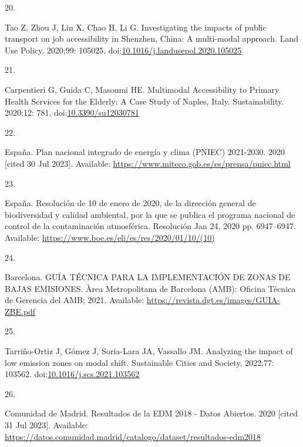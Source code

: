 \documentclass[10pt,letterpaper]{article}
\newlength{\cslhangindent}
\newlength{\csllabelwidth}
\newlength{\cslentryspacingunit} %
\newenvironment{CSLReferences}[2] %
 {%
  \setlength{\parindent}{0pt}
  \ifodd #1
  \let\oldpar\par
  \def\par{\hangindent=\cslhangindent\oldpar}
  \fi
  \setlength{\parskip}{#2\cslentryspacingunit}
 }%
 {}
\newcommand{\CSLLeftMargin}[1]{\parbox[t]{\csllabelwidth}{#1}}
\newcommand{\CSLRightInline}[1]{\parbox[t]{\linewidth - \csllabelwidth}{#1}\break}
\begin{document}
\begin{CSLReferences}{0}{0}
\leavevmode{}%
\CSLLeftMargin{20. }%
\CSLRightInline{Tao Z, Zhou J, Lin X, Chao H, Li G. Investigating the
impacts of public transport on job accessibility in {Shenzhen}, {China}:
A multi-modal approach. Land Use Policy. 2020;99: 105025.
doi:\href{https://doi.org/10.1016/j.landusepol.2020.105025}{10.1016/j.landusepol.2020.105025}}

\leavevmode{}%
\CSLLeftMargin{21. }%
\CSLRightInline{Carpentieri G, Guida C, Masoumi HE. Multimodal
{Accessibility} to {Primary Health Services} for the {Elderly}: {A Case
Study} of {Naples}, {Italy}. Sustainability. 2020;12: 781.
doi:\href{https://doi.org/10.3390/su12030781}{10.3390/su12030781}}

\leavevmode{}%
\CSLLeftMargin{22. }%
\CSLRightInline{España. Plan nacional integrado de energía y clima
({PNIEC}) 2021-2030. 2020 {[}cited 30 Jul 2023{]}. Available:
\url{https://www.miteco.gob.es/es/prensa/pniec.html}}

\leavevmode{}%
\CSLLeftMargin{23. }%
\CSLRightInline{España. Resolución de 10 de enero de 2020, de la
dirección general de biodiversidad y calidad ambiental, por la que se
publica el programa nacional de control de la contaminación atmosférica.
Resolución Jan 24, 2020 pp. 6947--6947. Available:
\url{https://www.boe.es/eli/es/res/2020/01/10/(10)}}

\leavevmode{}%
\CSLLeftMargin{24. }%
\CSLRightInline{Barcelona. {GUÍA} {TÉCNICA} {PARA} {LA} {IMPLEMENTACIÓN}
{DE} {ZONAS} {DE} {BAJAS} {EMISIONES}. Àrea Metropolitana de Barcelona
({AMB}): Oficina Técnica de Gerencia del {AMB}; 2021. Available:
\url{https://revista.dgt.es/images/GUIA-ZBE.pdf}}

\leavevmode{}%
\CSLLeftMargin{25. }%
\CSLRightInline{Tarriño-Ortiz J, Gómez J, Soria-Lara JA, Vassallo JM.
Analyzing the impact of low emission zones on modal shift. Sustainable
Cities and Society. 2022;77: 103562.
doi:\href{https://doi.org/10.1016/j.scs.2021.103562}{10.1016/j.scs.2021.103562}}

\leavevmode{}%
\CSLLeftMargin{26. }%
\CSLRightInline{Comunidad de Madrid. Resultados de la {EDM} 2018 - Datos
Abiertos. 2020 {[}cited 31 Jul 2023{]}. Available:
\url{https://datos.comunidad.madrid/catalogo/dataset/resultados-edm2018}}


\end{CSLReferences}
\end{document}
